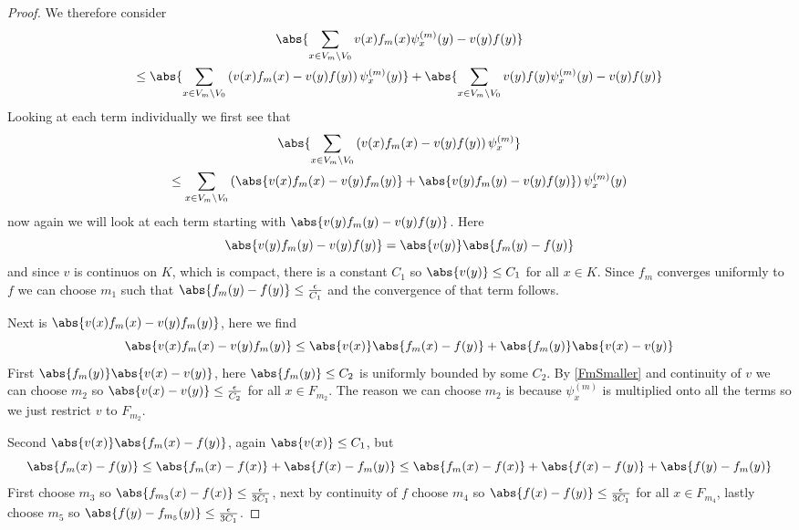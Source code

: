 \begin{proof}
	We therefore consider
	\begin{multline}
		\abs{\sum_{x \in V_m \backslash V_0} v(x) f_m(x) \psi_x^{(m)}(y) -v(y)f(y)} \\
		\leq \abs{\sum_{x \in V_m \backslash V_0} \left(v(x) f_m(x) - v(y)f(y) \right) \psi_x^{(m)}(y)} + \abs{\sum_{x \in V_m \backslash V_0} v(y) f(y) \psi_x^{(m)}(y) -v(y)f(y)}
	\end{multline}
	Looking at each term individually we first see that
	\begin{multline}
		\abs{\sum_{x \in V_m \backslash V_0} \left(v(x) f_m(x) - v(y)f(y) \right) \psi_x^{(m)}} \\ 
		\leq \sum_{x \in V_m \backslash V_0} \left(\abs{v(x) f_m(x) - v(y)f_m(y)} + \abs{v(y)f_m(y) - v(y)f(y)}\right) \psi_x^{(m)}(y)
	\end{multline}
	now again we will look at each term starting with $\abs{v(y) f_m(y) - v(y)f(y)}$. Here
	$$\abs{v(y) f_m(y) - v(y)f(y)} = \abs{v(y)}\abs{f_m(y) - f(y)}$$
	and since $v$ is continuos on $K$, which is compact, there is a constant $C_1$ so $\abs{v(y)} \leq C_1$ for all $x \in K$. Since $f_m$ converges uniformly to $f$ we can choose $m_1$ such that $\abs{f_m(y)- f(y)} \leq \frac{\epsilon}{C_1}$ and the convergence of that term follows.
	
	Next is $\abs{v(x) f_m(x) - v(y)f_m(y)}$, here we find
	\begin{equation}
		\abs{v(x) f_m(x) - v(y)f_m(y)} \leq \abs{v(x)}\abs{f_m(x)-f(y)} + \abs{f_m(y)}\abs{v(x)-v(y)}
	\end{equation}
	First $\abs{f_m(y)}\abs{v(x)-v(y)}$, here $\abs{f_m(y)} \leq C_2$ is uniformly bounded by some $C_2$. By \cref{FmSmaller} and continuity of $v$ we can choose $m_2$ so $\abs{v(x)-v(y)} \leq \frac{\epsilon}{C_2}$ for all $x \in F_{m_2}$. The reason we can choose $m_2$ is because $\psi_{x}^{(m)}$ is multiplied onto all the terms so we just restrict $v$ to $F_{m_2}$.
	
	Second $\abs{v(x)}\abs{f_m(x)-f(y)}$, again $\abs{v(x)} \leq C_1$, but
	\begin{equation}
		\abs{f_m(x)-f(y)} \leq \abs{f_m(x)-f(x)} + \abs{f(x) - f_m(y)} \leq \abs{f_m(x)-f(x)} + \abs{f(x) -f(y)} + \abs{f(y) - f_m(y)}
	\end{equation}
	First choose $m_3$ so $\abs{f_{m_3}(x)-f(x)} \leq \frac{\epsilon}{3 C_1}$, next by continuity of $f$ choose $m_4$ so $\abs{f(x) -f(y)} \leq \frac{\epsilon}{3 C_1}$ for all $x \in F_{m_4}$, lastly choose $m_5$ so $\abs{f(y)-f_{m_5}(y)} \leq \frac{\epsilon}{3 C_1}$.
	

\end{proof}
